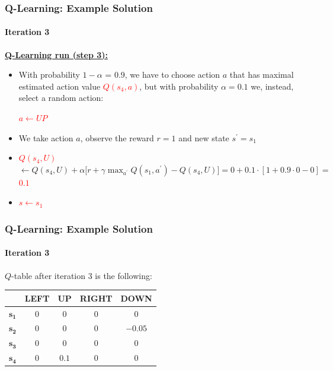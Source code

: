 \begin{frame}[<+->]
	\frametitle{Q-Learning: Example Solution}
	\framesubtitle{Iteration 3}
	
	\vspace{0.5cm}
	
	\textbf{\underline{Q-Learning run (step 3):}}
	
	\begin{itemize}
		\item With probability $ 1 - \alpha $ = 0.9, we have to choose action $ a $ that
			  has maximal estimated action value \textcolor{red}{$ Q(s_4,a) $}, but with
			  probability $ \alpha = 0.1 $ we, instead, select a random action:
			  
			  \begin{center}
				  \textcolor{red}{$ a \leftarrow UP $}
			  \end{center}
		\item We take action $ a $, observe the reward $ r = 1 $ and new state $
			  s^\prime = s_1 $
		\item \textcolor{red}{$ Q(s_4,U) $} $ \leftarrow Q(s_4,U) + \alpha \Big [ r + \gamma \max_{a^\prime} Q(s_1,a^\prime) - Q(s_4,U) \Big ] = 0 + 0.1 \cdot [ 1 + 0.9 \cdot 0 - 0 ] = $ \textcolor{red}{$ 0.1 $}
		\item \textcolor{red}{$ s \leftarrow s_1 $}
	\end{itemize}
\end{frame}

\begin{frame}
	\frametitle{Q-Learning: Example Solution}
	\framesubtitle{Iteration 3}
	
	\Large
	
	$ Q $-table after iteration 3 is the following:
	
	\begin{table}[!h]
		\begin{tabular}{c|c|c|c|c|}
			\cline{2-5}
			& \textbf{LEFT} & \textbf{UP} & \textbf{RIGHT} & \textbf{DOWN} \\ \hline
			\multicolumn{1}{|c|}{$ \mathbf{s_1} $} & $ 0 $ & $ 0 $ & $ 0 $ & $ 0 $\\ \hline
			\multicolumn{1}{|c|}{$ \mathbf{s_2} $} & $ 0 $ & $ 0 $ & $ 0 $ & $ -0.05 $\\ \hline
			\multicolumn{1}{|c|}{$ \mathbf{s_3} $} & $ 0 $ & $ 0 $ & $ 0 $ & $ 0 $\\ \hline
			\multicolumn{1}{|c|}{$ \mathbf{s_4} $} & $ 0 $ & $ 0.1 $ & $ 0 $ & $ 0 $\\ \hline
		\end{tabular}
	\end{table}
\end{frame}

